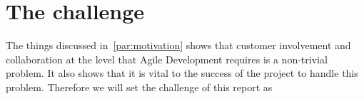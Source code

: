 \section{The challenge}\label{subsec:theChallenge}
The things discussed in~\autoref{par:motivation} shows that customer involvement and collaboration at the level that Agile Development requires is a non-trivial problem. It also shows that it is vital to the success of the project to handle this problem. Therefore we will set the challenge of this report as \\
\noindent\hrulefill\par
\noindent{} \\

